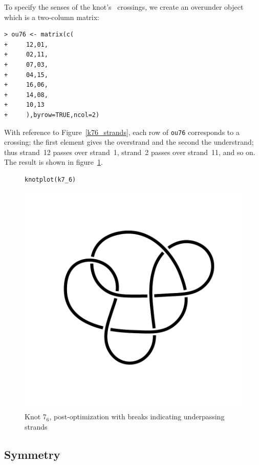 \documentclass{birkjour}
\theoremstyle{definition}
\theoremstyle{remark}
\numberwithin{equation}{section}
\begin{document}
To specify the senses of the knot's\ %
crossings, we create an overunder object which is a two-column matrix:

\begin{verbatim}
> ou76 <- matrix(c(
+     12,01,
+     02,11,
+     07,03,
+     04,15,
+     16,06,
+     14,08,
+     10,13
+     ),byrow=TRUE,ncol=2)
\end{verbatim}

With reference to Figure~\ref{k76_strands}, each row of {\tt ou76}
corresponds to a crossing; the first element gives the overstrand and
the second the understrand; thus strand~12 passes over strand~1,
strand~2 passes over strand~11, and so on. The result is shown in
figure~\ref{76_overunder}.

  
\begin{figure}[!tbp]
\begin{verbatim}
knotplot(k7_6)
\end{verbatim}
  \centering
\includegraphics[scale = 0.9]{knot-009}
\caption{Knot $7_6$, post-optimization with breaks indicating
  \label{76_overunder}  underpassing strands}
\end{figure}


\subsection{Symmetry}
\end{document}
